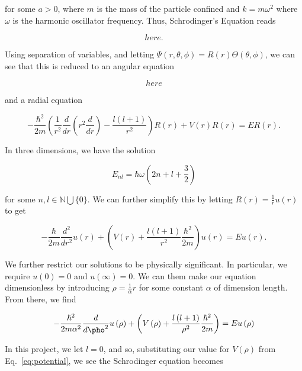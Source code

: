 \documentclass[12pt]{article}
\numberwithin{equation}{section}
\begin{document}
\noindent for some $a>0$, where $m$ is the mass of the particle confined and $k=m\omega^{2}$ where $\omega$ is the harmonic oscillator frequency.  Thus, Schrodinger's Equation reads

\begin{equation}
\label{eq:schrodpart1}
here.
\end{equation}

\noindent Using separation of variables, and letting $\Psi\left(r,\theta,\phi\right)=R\left(r\right)\Theta\left(\theta,\phi\right)$, we can see that this is reduced to an angular equation

\begin{equation}
\label{eq:schrodang}
here
\end{equation}

\noindent and a radial equation

\begin{equation}
\label{eq:schrodrad}
-\frac{\hbar^{2}}{2m}\left(\frac{1}{r^{2}}\frac{d}{dr}\left(r^{2}\frac{d}{dr}\right)-\frac{l\left(l+1\right)}{r^{2}}\right)R\left(r\right)+V\left(r\right)R\left(r\right)=ER\left(r\right).
\end{equation}

\noindent In three dimensions, we have the solution

\begin{equation}
\label{eq:schrodsol}
E_{nl}=\hbar\omega\left(2n+l+\frac{3}{2}\right)
\end{equation}

\noindent for some $n,l\in\mathbb{N}\bigcup\{0\}$.  We can further simplify this by letting $R\left(r\right)=\frac{1}{r}u\left(r\right)$ to get

$$-\frac{\hbar}{2m}\frac{d^{2}}{dr^{2}}u\left(r\right)+\left(V\left(r\right)+\frac{l\left(l+1\right)}{r^{2}}\frac{\hbar^{2}}{2m}\right)u\left(r\right)=Eu\left(r\right).$$

\noindent We further restrict our solutions to be physically significant.  In particular, we require $u\left(0\right)=0$ and $u\left(\infty\right)=0$.  We can them make our equation dimensionless by introducing $\rho=\frac{1}{\alpha}r$ for some constant $\alpha$ of dimension length.  From there, we find

$$-\frac{\hbar^{2}}{2m\alpha^{2}}\frac{d}{d\pho^2}u\left(\rho\right)+\left(V\left(\rho\right)+\frac{l\left(l+1\right)}{\rho^{2}}\frac{\hbar^{2}}{2m}\right)=Eu\left(\rho\right)$$

\noindent In this project, we let $l=0$, and so, substituting our value for $V\left(\rho\right)$ from Eq.~\ref{eq:potential}, we see the Schrodinger equation becomes
\end{document}
